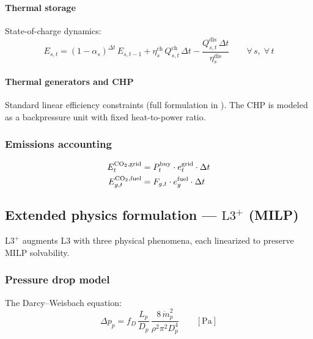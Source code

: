 \documentclass[review,3p]{elsarticle}
\newcommand{\Lplus}{\mathrm{L3}^{+}}
\begin{document}
\paragraph{Thermal storage}
State-of-charge dynamics:
\begin{equation}
  E_{s,t} = (1-\alpha_s)^{\Delta t}\, E_{s,t-1}
    + \eta_{s}^{\mathrm{ch}}\, Q_{s,t}^{\mathrm{ch}}\, \Delta t
    - \frac{Q_{s,t}^{\mathrm{dis}}\, \Delta t}{
      \eta_{s}^{\mathrm{dis}}}
  \qquad \forall\, s,\; \forall\, t
  \label{eq:storage_soc}
\end{equation}

\paragraph{Thermal generators and CHP}
Standard linear efficiency constraints (full formulation in
). The CHP is modeled as a backpressure
unit with fixed heat-to-power ratio.

\subsubsection{Emissions accounting}

\begin{align}
  E_t^{\ce{CO2},\mathrm{grid}} &=
    P_t^{\mathrm{buy}} \cdot e_t^{\mathrm{grid}} \cdot \Delta t
  \label{eq:em_grid} \\
  E_{g,t}^{\ce{CO2},\mathrm{fuel}} &=
    F_{g,t} \cdot e_g^{\mathrm{fuel}} \cdot \Delta t
  \label{eq:em_fuel}
\end{align}

\subsection{Extended physics formulation --- $\Lplus$ (MILP)}
\label{sec:milp_extended}

$\Lplus$ augments L3 with three physical phenomena, each linearized
to preserve MILP solvability.

\subsubsection{Pressure drop model}
\label{sec:model_pressure}

The Darcy--Weisbach equation:
%
\begin{equation}
  \Delta p_{p} = f_D \,\frac{L_p}{D_p}\,
    \frac{8\,\dot{m}_p^2}{\rho^2 \pi^2 D_p^4}
  \qquad [\text{Pa}]
  \label{eq:darcy}
\end{equation}
\end{document}
